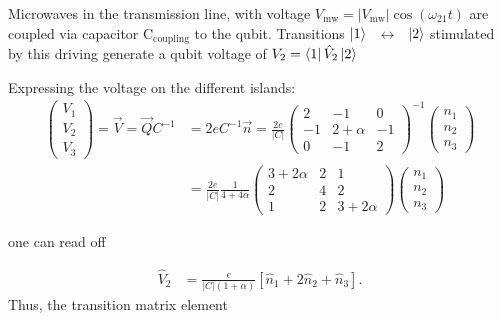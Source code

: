 \documentclass[%
superscriptaddress,
preprint,
preprintnumbers,
bibnotes,
amsmath,
amssymb,
aps,
showkeys,
prb,
]{revtex4-2}
\newcommand{\iket}[1]{\ensuremath{\Ket{#1}}}
\newcommand{\ibra}[1]{\ensuremath{\Bra{#1}}}
\newcommand{\iabs}[1]{\ensuremath{\left|#1\right|}}
\newcommand{\ilra}{\ensuremath{\,\leftrightarrow\,}}
\begin{document}
Microwaves   in  the  transmission  line,   with  voltage
$   V_{\text{mw}}=   \iabs{V_{\text{mw}}}\cos(\omega_{21   }t)   $  are   coupled   via   capacitor
C$_{\text{coupling}}$  to   the  qubit. Transitions \iket{1}~\ilra~\iket{2} stimulated by
this driving  generate a qubit voltage  of $  V_2 = \ibra{1}\hat{V}_2\iket{2} $ 

Expressing the voltage on the different islands:
  \begin{equation}
    \label{eq:dipole_voltage_8}
    \begin{aligned}
      \begin{pmatrix}
        V_{1}\\V_{2}\\V_{3}
      \end{pmatrix}  =  \vec{V}  =   \vec{Q}C^{-1}  &  =2eC^{-1}\vec{n}  =  \frac{2e}{\iabs{C}
      }\begin{pmatrix}
          2 & -1 & 0\\
          -1 & 2 + \alpha & -1\\
          0 & -1 & 2
        \end{pmatrix}^{-1} \begin{pmatrix} n_{1}\\n_{2}\\n_{3}
      \end{pmatrix}\\
      & = \frac{2e}{\iabs{C}} \frac{1}{4 + 4\alpha}\begin{pmatrix}
          3 + 2\alpha & 2 & 1\\
          2 & 4 & 2\\
          1 & 2 & 3+2\alpha
        \end{pmatrix} \begin{pmatrix} n_{1}\\n_{2}\\n_{3}
      \end{pmatrix}
          \end{aligned}
  \end{equation}

  \noindent one can read off

  \begin{equation}
        \begin{aligned}
      \hat{V}_2 &  = \frac{e}{\iabs{C}(1+\alpha)}  \left[ \hat{n}_1  + 2\hat{n}_{2}
        +\hat{n}_3 \right].
      
    \end{aligned}
  \end{equation}
  Thus, the transition matrix element
\end{document}
